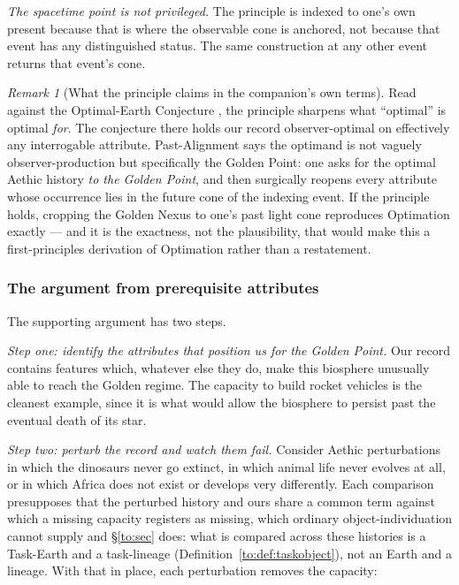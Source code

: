\documentclass[11pt]{article}
\numberwithin{equation}{section}
\theoremstyle{plain}
\theoremstyle{definition}
\theoremstyle{remark}
\newtheorem{remark}[theorem]{Remark}
\begin{document}
\emph{The spacetime point is not privileged.} The principle is indexed
to one's own present because that is where the observable cone is
anchored, not because that event has any distinguished status. The same
construction at any other event returns that event's cone.

\begin{remark}[What the principle claims in the companion's own terms]
\label{gc:rem:oec}
Read against the Optimal-Earth Conjecture \cite{Ben26Optimal}, the
principle sharpens what ``optimal'' is optimal \emph{for}. The
conjecture there holds our record observer-optimal on effectively any
interrogable attribute. Past-Alignment says the optimand is not
vaguely observer-production but specifically the Golden Point: one asks
for the optimal Aethic history \emph{to the Golden Point}, and then
surgically reopens every attribute whose occurrence lies in the future
cone of the indexing event. If the principle holds, cropping the Golden
Nexus to one's past light cone reproduces Optimation exactly --- and it
is the exactness, not the plausibility, that would make this a
first-principles derivation of Optimation rather than a restatement.
\end{remark}

\subsubsection{The argument from prerequisite attributes}
\label{gc:subsub:pastalign-argument}

The supporting argument has two steps.

\emph{Step one: identify the attributes that position us for the Golden
Point.} Our record contains features which, whatever else they do, make
this biosphere unusually able to reach the Golden regime. The capacity
to build rocket vehicles is the cleanest example, since it is what would
allow the biosphere to persist past the eventual death of its star.

\emph{Step two: perturb the record and watch them fail.} Consider
Aethic perturbations in which the dinosaurs never go extinct, in which
animal life never evolves at all, or in which Africa does not exist or
develops very differently. Each comparison presupposes that the
perturbed history and ours share a common term against which a missing
capacity registers as missing, which ordinary object-individuation
cannot supply and \S\ref{to:sec} does: what is compared across these
histories is a Task-Earth and a task-lineage
(Definition~\ref{to:def:taskobject}), not an Earth and a lineage. With
that in place, each perturbation removes the capacity:
\end{document}
